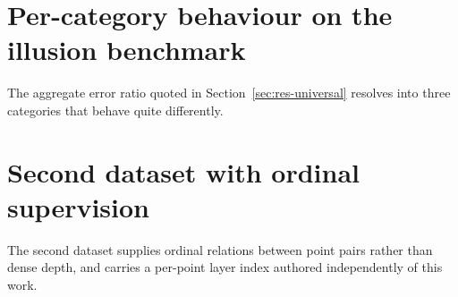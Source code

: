 \section{Per-category behaviour on the illusion benchmark}
\label{sec:supp-category}

The aggregate error ratio quoted in Section~\ref{sec:res-universal} resolves into three categories that behave quite differently.

\begin{table}[!ht]
\caption{\textbf{Admissible images by illusion category.} The penalty for reporting
depicted rather than physical geometry is largest where a display fills the frame,
and the reference measurement inside these regions is close to perfectly planar
while the prediction is not, confirming that the surface is flat and the prediction
is not. This is the per-category detail behind the aggregate quoted in
Section~\ref{sec:res-universal}.}
\label{tab:supp-category}
\begin{center}
\footnotesize
{}
\end{center}
\end{table}

\section{Second dataset with ordinal supervision}
\label{sec:supp-layered}

The second dataset supplies ordinal relations between point pairs rather than dense depth, and carries a per-point layer index authored independently of this work.

